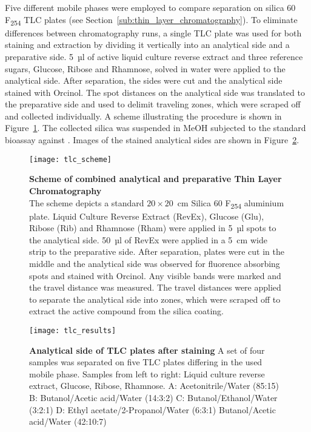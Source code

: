 Five different mobile phases were employed to compare separation on silica 60 F\textsubscript{254} TLC plates (see Section~\ref{sub:thin_layer_chromatography}).
To eliminate differences between chromatography runs, a single TLC plate was used for both staining and extraction by dividing it vertically into an analytical side and a preparative side.
5~µl of active liquid culture reverse extract and three reference sugars, Glucose, Ribose and Rhamnose, solved in water were applied to the analytical side.
After separation, the sides were cut and the analytical side stained with Orcinol.
The spot distances on the analytical side was translated to the preparative side and used to delimit traveling zones, which were scraped off and collected individually.
A scheme illustrating the procedure is shown in Figure~\ref{fig:tlc_scheme}.
The collected silica was suspended in MeOH subjected to the standard bioassay against \coli{}.
Images of the stained analytical sides are shown in Figure~\ref{fig:tlc_results}.

\begin{figure}[htbp]
	\centering
	\texttt{[image: tlc\_scheme]}
	\caption[Scheme of combined analytical and preparative Thin Layer Chromatography]{%
		\textbf{Scheme of combined analytical and preparative Thin Layer Chromatography}\\
		The scheme depicts a standard $20 \times 20$~cm Silica 60 F\textsubscript{254} aluminium plate.
		Liquid Culture Reverse Extract (RevEx), Glucose (Glu), Ribose (Rib) and Rhamnose (Rham) were applied in 5~µl spots to the analytical side.
		50~µl of RevEx were applied in a 5~cm wide strip to the preparative side.
		After separation, plates were cut in the middle and the analytical side was observed for fluorence absorbing spots and stained with Orcinol.
		Any visible bands were marked and the travel distance was measured.
		The travel distances were applied to separate the analytical side into zones, which were scraped off to extract the active compound from the silica coating.
	}
	\label{fig:tlc_scheme}
\end{figure}

\begin{figure}[htbp]
	\centering
	\texttt{[image: tlc\_results]}
	\caption[Analytical side of TLC plates after staining]{%
		\textbf{Analytical side of TLC plates after staining}
		A set of four samples was separated on five TLC plates differing in the used mobile phase.
		Samples from left to right: Liquid culture reverse extract, Glucose, Ribose, Rhamnose. 
		A: Acetonitrile/Water (85:15)
		B: Butanol/Acetic acid/Water (14:3:2)
		C: Butanol/Ethanol/Water (3:2:1)
		D: Ethyl acetate/2-Propanol/Water (6:3:1)
		Butanol/Acetic acid/Water (42:10:7)
	}
	\label{fig:tlc_results}
\end{figure}

